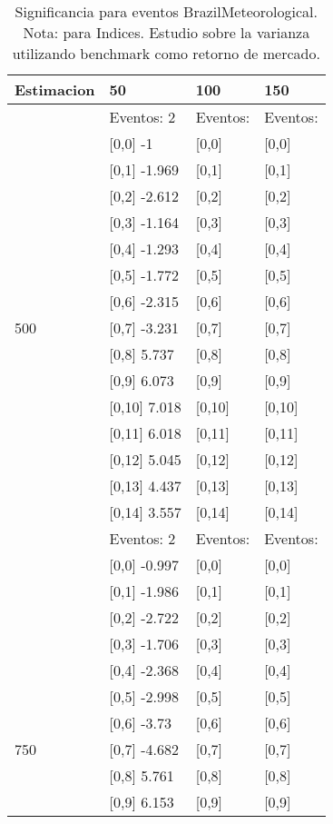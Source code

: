 \begin{table}

\caption{Significancia para eventos BrazilMeteorological. Nota: para Indices. Estudio sobre la varianza utilizando benchmark como retorno de mercado.}
\centering
\begin{tabular}[t]{llll}
\toprule
Estimacion & 50 & 100 & 150\\
\midrule
 & Eventos:  2 & Eventos: & Eventos:\\
 & {}[0,0] -1 & {}[0,0] & {}[0,0]\\
 & {}[0,1] -1.969 & {}[0,1] & {}[0,1]\\
 & {}[0,2] -2.612 & {}[0,2] & {}[0,2]\\
 & {}[0,3] -1.164 & {}[0,3] & {}[0,3]\\
\addlinespace
 & {}[0,4] -1.293 & {}[0,4] & {}[0,4]\\
 & {}[0,5] -1.772 & {}[0,5] & {}[0,5]\\
 & {}[0,6] -2.315 & {}[0,6] & {}[0,6]\\
500 & {}[0,7] -3.231 & {}[0,7] & {}[0,7]\\
 & {}[0,8] 5.737 & {}[0,8] & {}[0,8]\\
\addlinespace
 & {}[0,9] 6.073 & {}[0,9] & {}[0,9]\\
 & {}[0,10] 7.018 & {}[0,10] & {}[0,10]\\
 & {}[0,11] 6.018 & {}[0,11] & {}[0,11]\\
 & {}[0,12] 5.045 & {}[0,12] & {}[0,12]\\
 & {}[0,13] 4.437 & {}[0,13] & {}[0,13]\\
\addlinespace
 & {}[0,14] 3.557 & {}[0,14] & {}[0,14]\\
 & Eventos:  2 & Eventos: & Eventos:\\
 & {}[0,0] -0.997 & {}[0,0] & {}[0,0]\\
 & {}[0,1] -1.986 & {}[0,1] & {}[0,1]\\
 & {}[0,2] -2.722 & {}[0,2] & {}[0,2]\\
\addlinespace
 & {}[0,3] -1.706 & {}[0,3] & {}[0,3]\\
 & {}[0,4] -2.368 & {}[0,4] & {}[0,4]\\
 & {}[0,5] -2.998 & {}[0,5] & {}[0,5]\\
 & {}[0,6] -3.73 & {}[0,6] & {}[0,6]\\
750 & {}[0,7] -4.682 & {}[0,7] & {}[0,7]\\
\addlinespace
 & {}[0,8] 5.761 & {}[0,8] & {}[0,8]\\
 & {}[0,9] 6.153 & {}[0,9] & {}[0,9]\\

\end{tabular}
\end{table}
